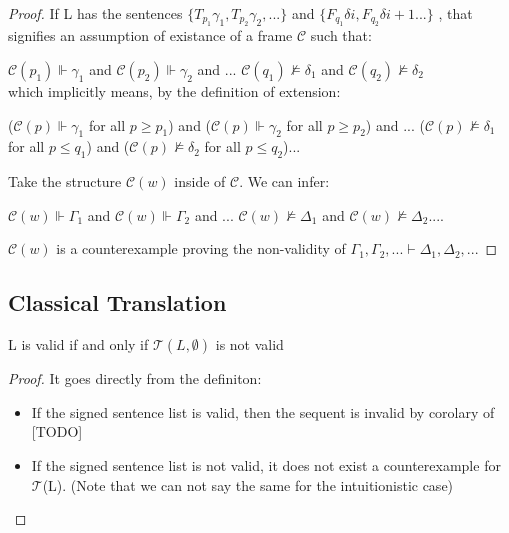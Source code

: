 \documentclass[runningheads]{llncs}
\begin{document}
    \begin{proof} 
    If L has the sentences
    $\{ T_{p_1}\gamma_{1}, T_{p_2}\gamma_{2}, ...\}$
   and 
       $ \{F_{q_1}\delta{i}, F_{q_2}\delta{i+1}...\}$ 
    , that signifies an assumption of existance of a frame $ \mathcal{C}$
    such that: 


    $ \mathcal{C}(p_1) \Vdash \gamma_{1}$ and $ \mathcal{C}(p_{2}) \Vdash \gamma_{2}$ and ... $ \mathcal{C}(q_{1}) \nvDash \delta_{1}$  and $ \mathcal{C}(q_{2}) \nvDash \delta_{2}$ 
   \\  which implicitly means, by the definition of extension: 
    
   ($ \mathcal{C}(p) \Vdash \gamma_{1}$ for all $p \geq p_1$) and ($ \mathcal{C}(p) \Vdash \gamma_{2}$ for all $p \geq p_2$) and ... ($ \mathcal{C}(p) \nvDash \delta_{1}$ for all $p \leq q_{1}$) and ($ \mathcal{C}(p) \nvDash \delta_{2}$ for all $p \leq q_{2}$)...
     
   
   Take the structure $\mathcal{C}(w)$ inside of $\mathcal{C}$. We can infer:
   
   $ \mathcal{C}(w) \Vdash \Gamma_{1}$ and $ \mathcal{C}(w) \Vdash \Gamma_{2}$ and ... $ \mathcal{C}(w) \nvDash \Delta_1$  and $ \mathcal{C}(w) \nvDash \Delta_2 ...$.
   
   $\mathcal{C}(w)$ is a counterexample proving the non-validity of 
    $\Gamma_{1}, \Gamma_{2}, ... \vdash \Delta_1, \Delta_2, ...$
    \end{proof}
\subsection{Classical Translation}

\begin{theorem} 
    L is valid if and only if $\mathcal{T}(L,\emptyset)$ is not valid 
\end{theorem}

\begin{proof}
    It goes directly from the definiton:
    \begin{itemize}
\item If the signed sentence list is valid, then the sequent is invalid by corolary of [TODO]
\item If the signed sentence list is not valid, it does not exist a counterexample for $\mathcal{T}$(L). (Note that 
we can not say the same for the intuitionistic case)
   \end{itemize}
\end{proof}
\end{document}

